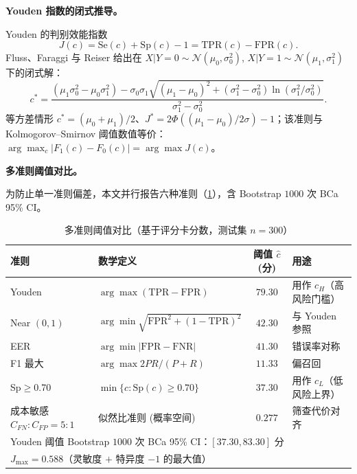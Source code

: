 \documentclass{MathorCupmodeling}
\begin{document}
\noindent\textbf{Youden 指数的闭式推导。}

Youden \cite{youden1950} 的判别效能指数
\begin{equation}
J(c)=\mathrm{Se}(c)+\mathrm{Sp}(c)-1=\mathrm{TPR}(c)-\mathrm{FPR}(c).
\label{eq:youden}
\end{equation}
Fluss、Faraggi 与 Reiser \cite{fluss2005youden} 给出在 $X|Y{=}0\sim\mathcal N(\mu_0,\sigma_0^2)$, $X|Y{=}1\sim\mathcal N(\mu_1,\sigma_1^2)$ 下的闭式解：
\begin{equation}
c^{*}=\frac{(\mu_1\sigma_0^{2}-\mu_0\sigma_1^{2})-\sigma_0\sigma_1\sqrt{(\mu_1-\mu_0)^{2}+(\sigma_1^{2}-\sigma_0^{2})\ln(\sigma_1^{2}/\sigma_0^{2})}}{\sigma_1^{2}-\sigma_0^{2}}.
\label{eq:youden-closed}
\end{equation}
等方差情形 $c^{*}=(\mu_0+\mu_1)/2$、$J^{*}=2\Phi((\mu_1-\mu_0)/2\sigma)-1$；该准则与 Kolmogorov--Smirnov 阈值数值等价：$\arg\max_c|F_1(c)-F_0(c)|=\arg\max J(c)$。

\noindent\textbf{多准则阈值对比。}

为防止单一准则偏差，本文并行报告六种准则（\cref{tab:q2-thr}），含 Bootstrap $1000$ 次 BCa 95\% CI。

\begin{table}[H]
\centering\small
\caption{多准则阈值对比（基于评分卡分数，测试集 $n=300$）}\label{tab:q2-thr}
\begin{tabular}{@{}l l c l@{}}
\toprule
准则 & 数学定义 & 阈值 $\hat c$ (分) & 用途 \\
\midrule
Youden & $\arg\max(\mathrm{TPR}-\mathrm{FPR})$ & $79.30$ & 用作 $c_H$（高风险门槛） \\
Near $(0,1)$ & $\arg\min\sqrt{\mathrm{FPR}^2+(1-\mathrm{TPR})^2}$ & $42.30$ & 与 Youden 参照 \\
EER & $\arg\min|\mathrm{FPR}-\mathrm{FNR}|$ & $41.30$ & 错误率对称 \\
F1 最大 & $\arg\max 2PR/(P+R)$ & $11.33$ & 偏召回 \\
Sp$\ge$0.70 & $\min\{c:\mathrm{Sp}(c)\ge 0.70\}$ & $37.30$ & 用作 $c_L$（低风险上界） \\
成本敏感 $C_{\!FN}{:}C_{\!FP}{=}5{:}1$ & 似然比准则 (概率空间) & $0.277$ & 筛查代价对齐 \\
\midrule
\multicolumn{4}{l}{Youden 阈值 Bootstrap $1000$ 次 BCa 95\% CI：$[37.30, 83.30]$ 分} \\
\multicolumn{4}{l}{$J_{\max}=0.588$（灵敏度 $+$ 特异度 $-1$ 的最大值）} \\
\bottomrule
\end{tabular}
\end{table}
\end{document}
